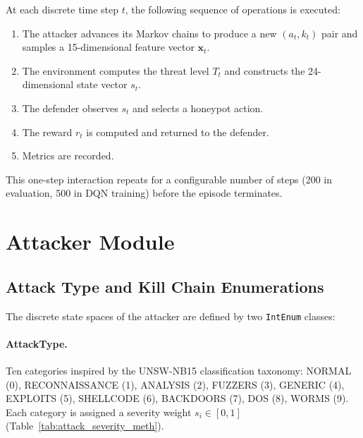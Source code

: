 At each discrete time step $t$, the following sequence of operations is
executed:
%
\begin{enumerate}
  \item The attacker advances its Markov chains to produce a new
        $(a_t, k_t)$ pair and samples a 15-dimensional feature vector
        $\mathbf{x}_t$.
  \item The environment computes the threat level $T_t$ and constructs
        the 24-dimensional state vector $s_t$.
  \item The defender observes $s_t$ and selects a honeypot action.
  \item The reward $r_t$ is computed and returned to the defender.
  \item Metrics are recorded.
\end{enumerate}

This one-step interaction repeats for a configurable number of steps
(200 in evaluation, 500 in DQN training) before the episode terminates.

\section{Attacker Module}
\label{sec:attacker}

\subsection{Attack Type and Kill Chain Enumerations}

The discrete state spaces of the attacker are defined by two \texttt{IntEnum}
classes:

\paragraph{AttackType.}
Ten categories inspired by the UNSW-NB15 classification taxonomy:
NORMAL (0), RECONNAISSANCE (1), ANALYSIS (2), FUZZERS (3), GENERIC (4),
EXPLOITS (5), SHELLCODE (6), BACKDOORS (7), DOS (8), WORMS (9).
Each category is assigned a severity weight $s_i \in [0, 1]$
(Table~\ref{tab:attack_severity_meth}).

